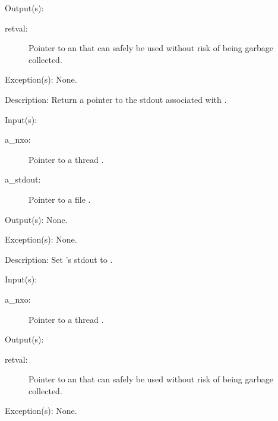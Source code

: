 \begin{capi}
\begin{capilist}
	\item[Output(s): ]
		\begin{description}\item[]
		\item[retval: ]
			Pointer to an  that can safely be used
			without risk of being garbage collected.
		\end{description}
	\item[Exception(s): ] None.
	\item[Description: ]
		Return a pointer to the stdout associated with .
	\end{capilist}
\label{nxo_thread_stdout_set}
	\begin{capilist}
	\item[Input(s): ]
		\begin{description}\item[]
		\item[a\_nxo: ]
			Pointer to a thread .
		\item[a\_stdout: ]
			Pointer to a file .
		\end{description}
	\item[Output(s): ] None.
	\item[Exception(s): ] None.
	\item[Description: ]
		Set 's stdout to .
	\end{capilist}
\label{nxo_thread_stderr_get}
	\begin{capilist}
	\item[Input(s): ]
		\begin{description}\item[]
		\item[a\_nxo: ]
			Pointer to a thread \classname{nxo}.
		\end{description}
	\item[Output(s): ]
		\begin{description}\item[]
		\item[retval: ]
			Pointer to an  that can safely be used
			without risk of being garbage collected.
		\end{description}
	\item[Exception(s): ] None.

\end{capilist}
\end{capi}
